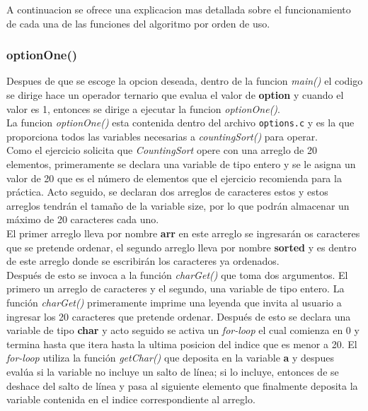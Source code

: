 \documentclass{article}
\begin{document}
			A continuacion se ofrece una explicacion mas detallada sobre el funcionamiento de cada una de las funciones del algoritmo por orden de uso. 
		
			\subsubsection{optionOne()}
			
				Despues de que se escoge la opcion deseada, dentro de la funcion \emph{main()} el codigo se dirige hace un operador ternario que evalua el valor de \textbf{option} y cuando el valor es 1, entonces se dirige a ejecutar la funcion \emph{optionOne()}.\\
				
				La funcion \emph{optionOne()} esta contenida dentro del archivo \verb|options.c| y es la que proporciona todos las variables necesarias a \emph{countingSort()} para operar.\\
				
				Como el ejercicio solicita que \emph{CountingSort} opere con una arreglo de 20 elementos, primeramente se declara una variable de tipo entero y se le asigna un valor de 20 que es el número de elementos que el ejercicio recomienda para la práctica. Acto seguido, se declaran dos arreglos de caracteres estos y estos arreglos tendrán el tamaño de la variable size, por lo que podrán almacenar un máximo de 20 caracteres cada uno.\\ 
				
				El primer arreglo lleva por nombre \textbf{arr} en este arreglo se ingresarán os caracteres que se pretende ordenar, el segundo arreglo lleva por nombre \textbf{sorted} y es dentro de este arreglo donde se escribirán los caracteres ya ordenados.\\
				
				Después de esto se invoca a la función \emph{charGet()} que toma dos argumentos. El primero un arreglo de caracteres y el segundo, una variable de tipo entero. La función \emph{charGet()} primeramente imprime una leyenda que invita al usuario a ingresar los 20 caracteres que pretende ordenar. Después de esto se declara una variable de tipo \textbf{char} y acto seguido se activa un \emph{for-loop} el cual comienza en 0 y termina hasta que itera hasta la ultima posicion del indice que es menor a 20. El \emph{for-loop} utiliza la función \emph{getChar()} que deposita en la variable \textbf{a} y despues evalúa si la variable no incluye un salto de línea; si lo incluye, entonces de se deshace del salto de línea y pasa al siguiente elemento que finalmente deposita la variable contenida en el indice correspondiente al arreglo.\\
				
\end{document}
